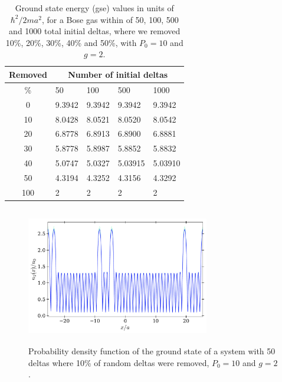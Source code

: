 \documentclass[twocolumn,showpacs,showkeys,preprintnumbers,superscriptaddress, pra, 10pt, aps]{revtex4-2}
\begin{document}
\begin{table}[H]
  \begin{center}
    {\small    \begin{tabular}{c|llll}
        \toprule
        Removed & \multicolumn{4}{c}{Number of initial deltas}                              \\
        \midrule
        \%      & 50                                           & 100    & 500     & 1000    \\ \hline
        0       & 9.3942                                       & 9.3942 & 9.3942  & 9.3942  \\
        10      & 8.0428                                       & 8.0521 & 8.0520  & 8.0542  \\
        20      & 6.8778                                       & 6.8913 & 6.8900  & 6.8881  \\
        30      & 5.8778                                       & 5.8987 & 5.8852  & 5.8832  \\
        40      & 5.0747                                       & 5.0327 & 5.03915 & 5.03910 \\
        50      & 4.3194                                       & 4.3252 & 4.3156  & 4.3292  \\
        100     & 2                                            & 2      & 2       & 2       \\
        \bottomrule
      \end{tabular}
    } \caption{Ground state energy (gse) values in units of $\hbar^2/2ma^2$, for a Bose gas within of  50, 100, 500
      and 1000 total initial deltas, where we removed  10\%, 20\%, 30\%, 40\% and 50\%, with $P_0=10$ and $g=2$.}
    \label{table:tabla3}
  \end{center}%
\end{table}
\vspace{-1.2cm}
\begin{figure}[H]
  \includegraphics[height=6cm, width=8cm]{g=2.pdf}
  \vspace{-0.5cm}
  \caption{Probability density function of the ground state of a system with 50
    deltas where 10\% of random deltas were removed, $P_0=10$ and $g=2$.}%
  \label{fig:FunOnda1}
\end{figure}
\end{document}
